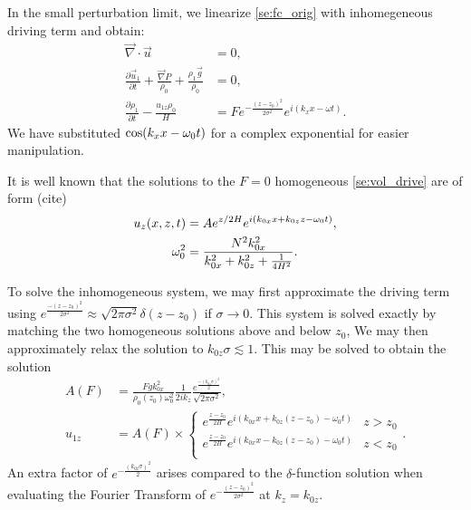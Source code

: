 \documentclass[twocolumn,
        nofootinbib,
        usenames, %
        dvipsnames %
    ]{revtex4-1}%
\newcommand*{\pd}[2]{\frac{\partial#1}{\partial#2}}
\DeclarePairedDelimiter\p{\lparen}{\rparen}
\begin{document}
In the small perturbation limit, we linearize \autoref{se:fc_orig} with
inhomegeneous driving term and obtain:
\begin{subequations}\label{se:vol_drive}
    \begin{align}
        \vec{\nabla} \cdot \vec{u} &= 0,\\
        \pd{\vec{u}_1}{t} + \frac{\vec{\nabla}P}{\rho_0}
            + \frac{\rho_1 \vec{g}}{\rho_0}
            &= 0,\\
        \pd{\rho_1}{t} - \frac{u_{1z} \rho_0}{H}
            &= Fe^{-\frac{(z - z_0)^2}{2\sigma^2}}
                e^{i(k_xx - \omega t)}.
    \end{align}
\end{subequations}
We have substituted $\cos\p*{k_xx - \omega_0t}$ for a complex exponential for
easier manipulation.

It is well known that the solutions to the $F = 0$ homogeneous
\autoref{se:vol_drive} are of form (cite)
\begin{subequations}\label{se:lin_sol}
    \begin{align}
        u_z\p*{x, z, t} &= Ae^{z/2H}e^{i(k_{0x}x + k_{0z}z - \omega_0 t)},\\
        \omega_0^2 &= \frac{N^2k_{0x}^2}{k_{0x}^2 + k_{0z}^2 + \frac{1}{4H^2}}.
    \end{align}
\end{subequations}

To solve the inhomogeneous system, we may first approximate the driving term
using $e^{\frac{-(z - z_0)^2}{2\sigma^2}} \approx \sqrt{2\pi \sigma^2}\delta(z -
z_0)$ if $\sigma \to 0$. This system is solved exactly by matching the two
homogeneous solutions above and below $z_0$, We may then approximately relax the
solution to $k_{0z}\sigma \lesssim 1$. This may be solved to obtain the solution
\begin{align}
    A(F) &= \frac{Fgk_{0x}^2}{\rho_0(z_0)\omega_0^2}
        \frac{1}{2ik_z}\frac{e^{\frac{-(k_{0z}\sigma)^2}{2}}}
        {\sqrt{2\pi\sigma^2}},\\
    u_{1z} &= A(F) \times\begin{cases}
        e^{\frac{z - z_0}{2H}}e^{i(k_{0x}x + k_{0z}(z - z_0) - \omega_0 t)}
            & z > z_0\\
        e^{\frac{z - z_0}{2H}}e^{i(k_{0x}x - k_{0z}(z - z_0) - \omega_0 t)}
            & z < z_0\\
    \end{cases}.\label{eq:uz_lin}
\end{align}
An extra factor of $e^{-\frac{(k_{0z}\sigma)^2}{2}}$ arises compared to the
$\delta$-function solution when evaluating the Fourier Transform of
$e^{-\frac{(z - z_0)^2}{2\sigma^2}}$ at $k_z = k_{0z}$.
\end{document}
